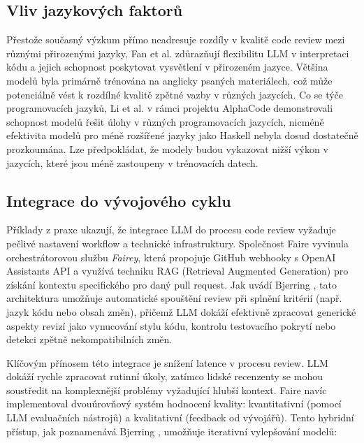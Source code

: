 \documentclass[12pt, a4paper]{article}
\begin{document}
\subsection{Vliv jazykových faktorů}
Přestože současný výzkum přímo neadresuje rozdíly v kvalitě code review mezi různými přirozenými jazyky, Fan et al. \cite{fan2023} zdůrazňují flexibilitu LLM v interpretaci kódu a jejich schopnost poskytovat vysvětlení v přirozeném jazyce. Většina modelů byla primárně trénována na anglicky psaných materiálech, což může potenciálně vést k rozdílné kvalitě zpětné vazby v různých jazycích. Co se týče programovacích jazyků, Li et al. \cite{li2022} v rámci projektu AlphaCode demonstrovali schopnost modelů řešit úlohy v různých programovacích jazycích, nicméně efektivita modelů pro méně rozšířené jazyky jako Haskell nebyla dosud dostatečně prozkoumána. Lze předpokládat, že modely budou vykazovat nižší výkon v jazycích, které jsou méně zastoupeny v trénovacích datech.

\subsection{Integrace do vývojového cyklu}
Příklady z praxe ukazují, že integrace LLM do procesu code review vyžaduje pečlivé nastavení workflow a technické infrastruktury. Společnost Faire vyvinula orchestrátorovou službu \textit{Fairey}, která propojuje GitHub webhooky s OpenAI Assistants API a využívá techniku RAG (Retrieval Augmented Generation) pro získání kontextu specifického pro daný pull request. Jak uvádí Bjerring \cite{bjerring2024automated}, tato architektura umožňuje automatické spouštění review při splnění kritérií (např. jazyk kódu nebo obsah změn), přičemž LLM dokáží efektivně zpracovat generické aspekty revizí jako vynucování stylu kódu, kontrolu testovacího pokrytí nebo detekci zpětně nekompatibilních změn.

Klíčovým přínosem této integrace je snížení latence v procesu review. LLM dokáží rychle zpracovat rutinní úkoly, zatímco lidské recenzenty se mohou soustředit na komplexnější problémy vyžadující hlubší kontext. Faire navíc implementoval dvouúrovňový systém hodnocení kvality: kvantitativní (pomocí LLM evaluačních nástrojů) a kvalitativní (feedback od vývojářů). Tento hybridní přístup, jak poznamenává Bjerring \cite{bjerring2024automated}, umožňuje iterativní vylepšování modelů: 
\end{document}
